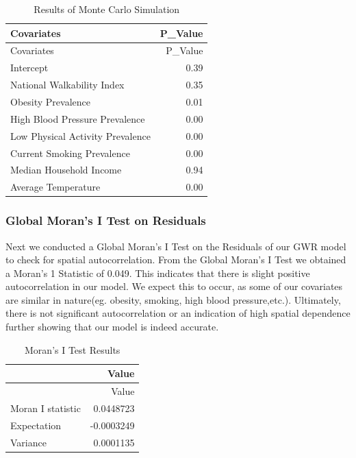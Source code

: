 \documentclass[
]{article}
\begin{document}
\begin{longtable}[]{@{}lr@{}}
\caption{Results of Monte Carlo Simulation}\tabularnewline
\toprule\noalign{}
Covariates & P\_Value \\
\midrule\noalign{}
\endfirsthead
\toprule\noalign{}
Covariates & P\_Value \\
\midrule\noalign{}
\endhead
\bottomrule\noalign{}
\endlastfoot
Intercept & 0.39 \\
National Walkability Index & 0.35 \\
Obesity Prevalence & 0.01 \\
High Blood Pressure Prevalence & 0.00 \\
Low Physical Activity Prevalence & 0.00 \\
Current Smoking Prevalence & 0.00 \\
Median Household Income & 0.94 \\
Average Temperature & 0.00 \\
\end{longtable}

\subsubsection{Global Moran's I Test on
Residuals}\label{global-morans-i-test-on-residuals}

Next we conducted a Global Moran's I Test on the Residuals of our GWR
model to check for spatial autocorrelation. From the Global Moran's I
Test we obtained a Moran's 1 Statistic of 0.049. This indicates that
there is slight positive autocorrelation in our model. We expect this to
occur, as some of our covariates are similar in nature(eg. obesity,
smoking, high blood pressure,etc.). Ultimately, there is not significant
autocorrelation or an indication of high spatial dependence further
showing that our model is indeed accurate.

\begin{longtable}[]{@{}lr@{}}
\caption{Moran's I Test Results}\tabularnewline
\toprule\noalign{}
& Value \\
\midrule\noalign{}
\endfirsthead
\toprule\noalign{}
& Value \\
\midrule\noalign{}
\endhead
\bottomrule\noalign{}
\endlastfoot
Moran I statistic & 0.0448723 \\
Expectation & -0.0003249 \\
Variance & 0.0001135 \\
\end{longtable}
\end{document}
